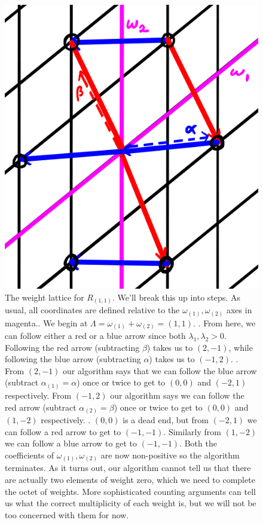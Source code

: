 \begin{figure}
    \centering
    \includegraphics{2018/11/20181122_s1-1.png}
    \caption{The weight lattice for $R_{(1,1)}$. We'll break this up into steps. As usual, all coordinates are defined relative to the $\omega_{(1)},\omega_{(2)}$ axes in magenta.. We begin at $\Lambda=\omega_{(1)}+\omega_{(2)}=(1,1)$. . From here, we can follow either a red or a blue arrow since both $\lambda_1,\lambda_2 >0$. Following the red arrow (subtracting $\beta$) takes us to $(2,-1)$, while following the blue arrow (subtracting $\alpha$) takes us to $(-1,2)$. . From $(2,-1)$ our algorithm says that we can follow the blue arrow (subtract $\alpha_{(1)}=\alpha$) once or twice to get to $(0,0)$ and $(-2,1)$ respectively. From $(-1,2)$ our algorithm says we can follow the red arrow (subtract $\alpha_{(2)}=\beta$) once or twice to get to $(0,0)$ and $(1,-2)$ respectively. . $(0,0)$ is a dead end, but from $(-2,1)$ we can follow a red arrow to get to $(-1,-1)$. Similarly from $(1,-2)$ we can follow a blue arrow to get to $(-1,-1)$. Both the coefficients of $\omega_{(1)},\omega_{(2)}$ are now non-positive so the algorithm terminates.\newline
    As it turns out, our algorithm cannot tell us that there are actually two elements of weight zero, which we need to complete the octet of weights. More sophisticated counting arguments can tell us what the correct multiplicity of each weight is, but we will not be too concerned with them for now.}
    \label{fig:s1-1}
\end{figure}

